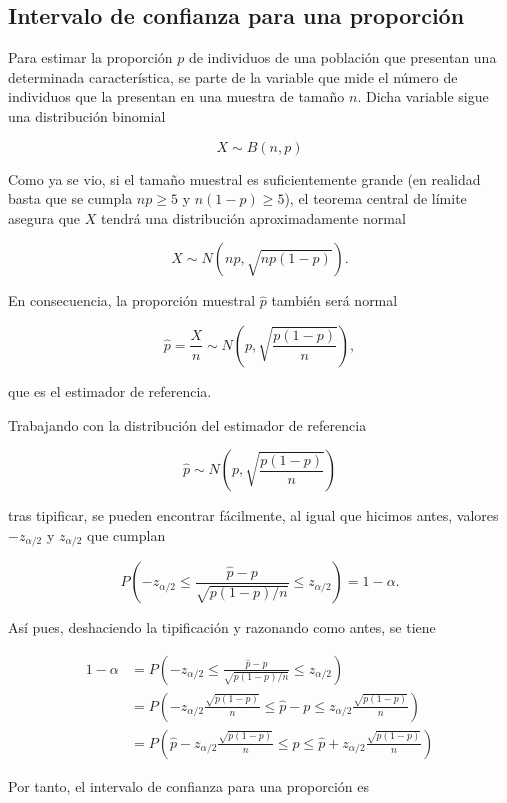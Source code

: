 \documentclass[
  spanish,
  a4paper,
]{scrreport}
\theoremstyle{plain}
\theoremstyle{definition}
\theoremstyle{definition}
\theoremstyle{remark}
\begin{document}
\subsection{Intervalo de confianza para una
proporción}\label{intervalo-de-confianza-para-una-proporciuxf3n}

Para estimar la proporción \(p\) de individuos de una población que
presentan una determinada característica, se parte de la variable que
mide el número de individuos que la presentan en una muestra de tamaño
\(n\). Dicha variable sigue una distribución binomial

\[
X\sim B(n,p)
\]

Como ya se vio, si el tamaño muestral es suficientemente grande (en
realidad basta que se cumpla \(np\geq 5\) y \(n(1-p)\geq 5\)), el
teorema central de límite asegura que \(X\) tendrá una distribución
aproximadamente normal

\[
X\sim N(np,\sqrt{np(1-p)}).
\]

En consecuencia, la proporción muestral \(\hat p\) también será normal

\[
\hat{p}=\frac{X}{n} \sim N\left(p,\sqrt{\frac{p(1-p)}{n}}\right),
\]

que es el estimador de referencia.

Trabajando con la distribución del estimador de referencia

\[
\hat p\sim N\left(p,\sqrt{\frac{p(1-p)}{n}}\right)
\]

tras tipificar, se pueden encontrar fácilmente, al igual que hicimos
antes, valores \(-z_{\alpha/2}\) y \(z_{\alpha/2}\) que cumplan

\[
P\left(-z_{\alpha/2}\leq \frac{\hat p-p}{\sqrt{p(1-p)/n}}\leq z_{\alpha/2} \right) = 1-\alpha.
\]

Así pues, deshaciendo la tipificación y razonando como antes, se tiene

\begin{align*}
1-\alpha 
&= P\left(-z_{\alpha/2}\leq \frac{\hat p-p}{\sqrt{p(1-p)/n}}\leq z_{\alpha/2} \right) \\
&= P\left(-z_{\alpha/2}\frac{\sqrt{p(1-p)}}{n}\leq \hat p-p\leq z_{\alpha/2}\frac{\sqrt{p(1-p)}}{n} \right) \\
&= P\left(\hat{p}-z_{\alpha/2}\frac{\sqrt{p(1-p)}}{n}\leq p\leq \hat{p}+z_{\alpha/2}\frac{\sqrt{p(1-p)}}{n} \right)
\end{align*}

Por tanto, el intervalo de confianza para una proporción es
\end{document}
